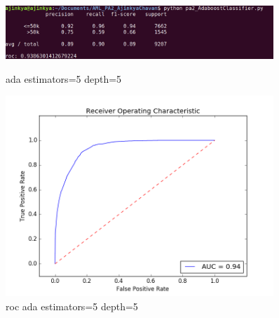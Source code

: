 \documentclass{article}
\begin{document}
\begin{figure}
    \centering
    \begin{minipage}{0.45\textwidth}
        \centering
        \includegraphics[width=0.9\textwidth]{ada_5_5.png} %
        \caption{ada estimators=5 depth=5}
    \end{minipage}\hfill
    \begin{minipage}{0.45\textwidth}
        \centering
        \includegraphics[width=0.9\textwidth]{roc_ada_5_5.png} %
        \caption{roc ada estimators=5 depth=5}
    \end{minipage}
\end{figure}
\end{document}
